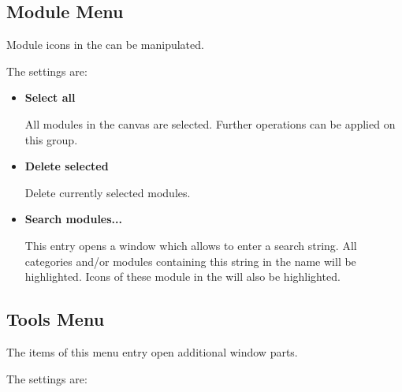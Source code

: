  
 

	 \subsection{Module Menu}
    \label{modulemenu}
	 
	 Module icons in the {\mycanvas} can be manipulated.


	 The settings are:

	 \begin{itemize}
	 \item {\bf Select all} 

	 All modules in the canvas are selected. Further operations can be applied on this group. 
    

	 \item {\bf Delete selected} 

	 Delete currently selected modules. 

	 \item {\bf Search modules...} 
    
    This entry opens a window which allows to enter a search string. All categories and/or modules containing 
    this string in the name will be highlighted. Icons of these module in the {\mycanvas} will also be highlighted.
	  

	 \end{itemize}


   \clearpage
   

	 \subsection{Tools Menu}
    \label{toolmenu}

	 The items of this menu entry open additional window parts.
	 


	 The settings are:

